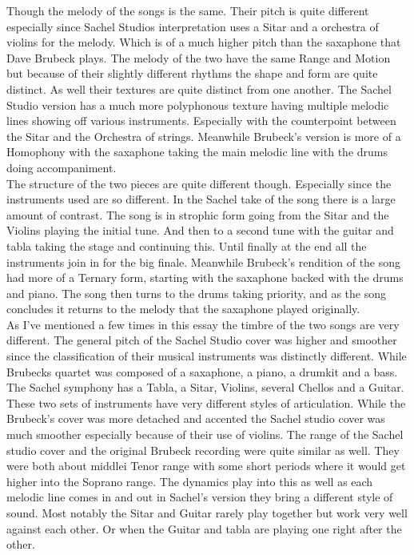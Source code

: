 \documentclass{article}
\begin{document}
Though the melody of the songs is the same. Their pitch is quite different
especially since Sachel Studios interpretation uses a Sitar and a orchestra of
violins for the melody. Which is of a much higher pitch than the saxaphone that
Dave Brubeck plays. The melody of the two have the same Range and Motion but
because of their slightly different rhythms the shape and form are quite
distinct. As well their textures are quite distinct from one another. The Sachel
Studio version has a much more polyphonous texture having multiple melodic lines
showing off various instruments. Especially with the counterpoint between the
Sitar and the Orchestra of strings. Meanwhile Brubeck's version is more of a
Homophony with the saxaphone taking the main melodic line with the drums doing
accompaniment. \\

The structure of the two pieces are quite different though. Especially since the
instruments used are so different. In the Sachel take of the song there is a
large amount of contrast. The song is in strophic form going from the Sitar and
the Violins playing the initial tune. And then to a second tune with the guitar
and tabla taking the stage and continuing this. Until finally at the end all the
instruments join in for the big finale. Meanwhile Brubeck's rendition of the
song had more of a Ternary form, starting with the saxaphone backed with the
drums and piano. The song then turns to the drums taking priority, and as the
song concludes it returns to the melody that the saxaphone played originally. \\

As I've mentioned a few times in this essay the timbre of the two songs are very
different. The general pitch of the Sachel Studio cover was higher and smoother
since the classification of their musical instruments was distinctly different.
While Brubecks quartet was composed of a saxaphone, a piano, a drumkit and a
bass. The Sachel symphony has a Tabla, a Sitar, Violins, several Chellos and a
Guitar. These two sets of instruments have very different styles of
articulation. While the Brubeck's cover was more detached and accented the
Sachel studio cover was much smoother especially because of their use of
violins. The range of the Sachel studio cover and the original Brubeck recording
were quite similar as well. They were both about middlei Tenor range with some 
short periods where it would get higher into the Soprano range. The dynamics 
play into this as well as each melodic line comes in and out in Sachel's version
they bring a different style of sound. Most notably the Sitar and Guitar rarely
play together but work very well against each other. Or when the Guitar and
tabla are playing one right after the other.\\
\end{document}
